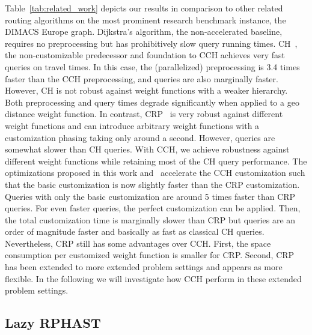 \documentclass[a4paper, english, cleveref]{lipics-v2021}
\begin{document}
Table~\ref{tab:related_work} depicts our results in comparison to other related routing algorithms on the most prominent research benchmark instance, the DIMACS Europe graph.
Dijkstra's algorithm, the non-accelerated baseline, requires no preprocessing but has prohibitively slow query running times.
CH~\cite{GeisbergerSSV12}, the non-customizable predecessor and foundation to CCH achieves very fast queries on travel times.
In this case, the (parallelized) preprocessing is 3.4 times faster than the CCH preprocessing, and queries are also marginally faster.
However, CH is not robust against weight functions with a weaker hierarchy.
Both preprocessing and query times degrade significantly when applied to a geo distance weight function.
In contrast, CRP~\cite{DellingGPW17} is very robust against different weight functions and can introduce arbitrary weight functions with a customization phasing taking only around a second.
However, queries are somewhat slower than CH queries.
With CCH, we achieve robustness against different weight functions while retaining most of the CH query performance.
The optimizations proposed in this work and~\cite{BuchholdSW19} accelerate the CCH customization such that the basic customization is now slightly faster than the CRP customization.
Queries with only the basic customization are around 5 times faster than CRP queries.
For even faster queries, the perfect customization can be applied.
Then, the total customization time is marginally slower than CRP but queries are an order of magnitude faster and basically as fast as classical CH queries.
Nevertheless, CRP still has some advantages over CCH.
First, the space consumption per customized weight function is smaller for CRP.
Second, CRP has been extended to more extended problem settings and appears as more flexible.
In the following we will investigate how CCH perform in these extended problem settings.

\subsection{Lazy RPHAST}
\end{document}
